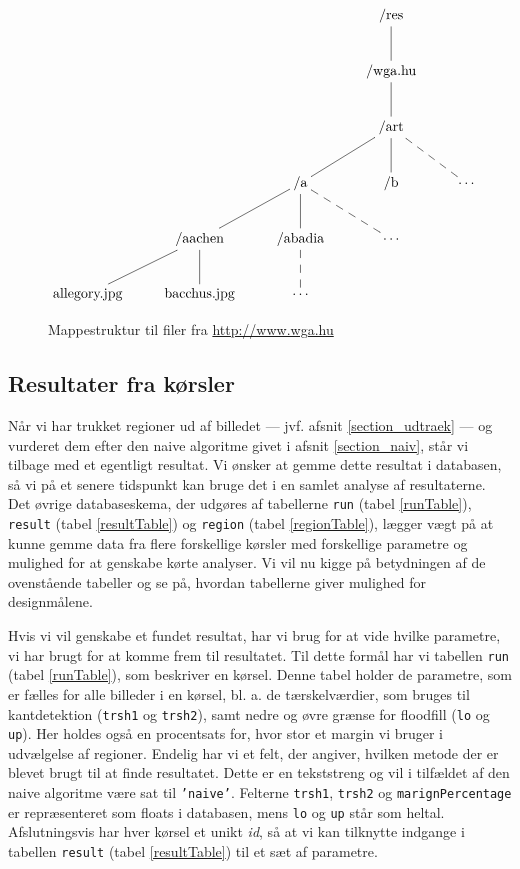{%
\begin{figure}[!h]
    \centering
$
\xymatrix{
 &  &   & \ar @{-} [d] \textrm{/res}  &                                                     \\
 &  &   & \ar @{-} [d] \textrm{/wga.hu}  &                                                  \\
 &  &   & \ar @{-} [dl] \ar @{-} [d] \ar @{--} [dr] \textrm{/art} &                         \\
 &  & \ar @{-} [dl] \ar @{-} [d] \ar @{--} [dr] \textrm{/a} & \textrm{/b} & \cdots          \\
 & \ar @{-} [dl] \ar @{-} [d] \textrm{/aachen} & \ar @{--} [d] \textrm{/abadia} & \cdots    \\
\textrm{allegory.jpg} & \textrm{bacchus.jpg} & \cdots &   &
}
$
    \caption{Mappestruktur til filer fra
        \href{http://www.wga.hu}{http://www.wga.hu}}
    \label{mappestruktur}
\end{figure}

\subsection{Resultater fra kørsler\label{section_results}}
Når vi har trukket regioner ud af billedet --- jvf. afsnit
\ref{section_udtraek} --- og vurderet dem efter den naive algoritme
givet i afsnit \ref{section_naiv}, står vi tilbage med et egentligt
resultat. Vi ønsker at gemme dette resultat i databasen, så vi på et
senere tidspunkt kan bruge det i en samlet analyse af resultaterne. Det
øvrige databaseskema, der udgøres af tabellerne \texttt{run} (tabel
\ref{runTable}), \texttt{result} (tabel \ref{resultTable}) og
\texttt{region} (tabel \ref{regionTable}), lægger vægt på at kunne gemme
data fra flere forskellige kørsler med forskellige parametre og mulighed
for at genskabe kørte analyser. Vi vil nu kigge på betydningen af de
ovenstående tabeller og se på, hvordan tabellerne giver mulighed for
designmålene.

Hvis vi vil genskabe et fundet resultat, har vi brug for at vide hvilke
parametre, vi har brugt for at komme frem til resultatet. Til dette
formål har vi tabellen \texttt{run} (tabel \ref{runTable}), som
beskriver en kørsel. Denne tabel holder de parametre, som er fælles for
alle billeder i en kørsel, bl. a. de tærskelværdier, som bruges til
kantdetektion (\texttt{trsh1} og \texttt{trsh2}), samt nedre og øvre
grænse for floodfill (\texttt{lo} og \texttt{up}). Her holdes også en
procentsats for, hvor stor et margin vi bruger i udvælgelse af
regioner. Endelig har vi et felt, der angiver, hvilken metode der er
blevet brugt til at finde resultatet. Dette er en tekststreng og vil i
tilfældet af den naive algoritme være sat til \texttt{'naive'}. Felterne
\texttt{trsh1}, \texttt{trsh2} og \texttt{marignPercentage} er
repræsenteret som floats i databasen, mens \texttt{lo} og \texttt{up}
står som heltal. Afslutningsvis har hver kørsel et unikt \emph{id}, så
at vi kan tilknytte indgange i tabellen \texttt{result} (tabel
\ref{resultTable}) til et sæt af parametre.

}
